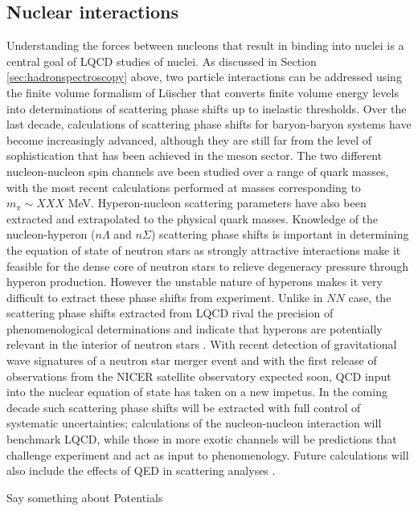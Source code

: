 \subsection{Nuclear interactions}


Understanding the  forces between nucleons that result in binding into nuclei is a central goal of LQCD studies of nuclei. As discussed in Section \ref{sec:hadronspectroscopy} above, two particle interactions can be addressed using the finite volume formalism of L\"uscher that converts finite volume energy levels into determinations of scattering phase shifts up to inelastic thresholds. Over the last decade, calculations of scattering phase shifts for baryon-baryon systems have become increasingly advanced, although they are still far from the level of sophistication that has been achieved in the meson sector. The two different nucleon-nucleon spin channels ave been studied over a range of quark masses, with the most recent calculations  performed at masses corresponding to $m_\pi\sim XXX$ MeV. Hyperon-nucleon scattering parameters have also been extracted and extrapolated to the physical quark masses.  
Knowledge of the nucleon-hyperon ($n\Lambda$ and $n\Sigma$) scattering phase shifts is  important in determining the equation of state of neutron stars as strongly attractive interactions make it feasible for the dense core of neutron stars to relieve degeneracy pressure through hyperon production. However the unstable nature of hyperons makes it very difficult to extract these phase shifts from experiment. Unlike in $NN$ case, the scattering phase shifts extracted from LQCD rival the precision of phenomenological determinations and indicate that hyperons are potentially relevant in the interior of neutron stars \cite{Beane:2012ey,Wagman:2017tmp}. With recent detection of gravitational wave signatures of a  neutron star merger event and with the first release of observations from the NICER satellite observatory expected soon, QCD input into the nuclear equation of state has taken on a new impetus. In the coming decade such scattering phase shifts will be extracted with full control of systematic uncertainties; calculations of the nucleon-nucleon interaction will benchmark LQCD, while those in more exotic channels will be predictions that challenge experiment and act as input to phenomenology. Future calculations will also include the effects of QED in scattering analyses \cite{Beane:2014qha}.

Say something about Potentials

